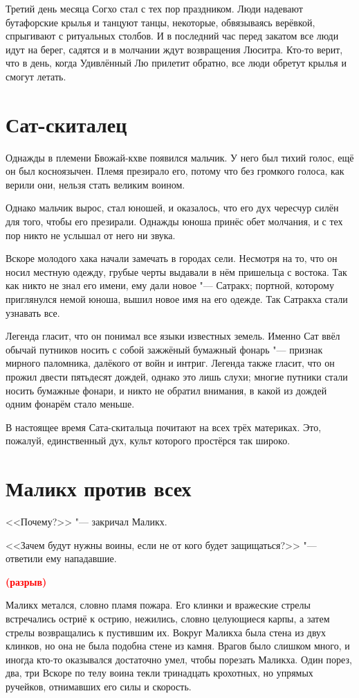 \documentclass[a4paper,10pt,fleqn]{book}
\newcommand{\ldotst}{\so{...}\xspace}
\newcommand{\spacing}{\textcolor{red}{\textbf{(разрыв)}}}
\begin{document}
Третий день месяца Согхо стал с тех пор праздником.
Люди надевают бутафорские крылья и танцуют танцы, некоторые, обвязываясь верёвкой, спрыгивают с ритуальных столбов.
И в последний час перед закатом все люди идут на берег, садятся и в молчании ждут возвращения Люситра.
Кто-то верит, что в день, когда Удивлённый Лю прилетит обратно, все люди обретут крылья и смогут летать.

\section{Сат-скиталец}

Однажды в племени Бвожай-кхве появился мальчик.
У него был тихий голос, ещё он был косноязычен.
Племя презирало его, потому что без громкого голоса, как верили они, нельзя стать великим воином.

Однако мальчик вырос, стал юношей, и оказалось, что его дух чересчур силён для того, чтобы его презирали.
Однажды юноша принёс обет молчания, и с тех пор никто не услышал от него ни звука.

Вскоре молодого хака начали замечать в городах сели.
Несмотря на то, что он носил местную одежду, грубые черты выдавали в нём пришельца с востока.
Так как никто не знал его имени, ему дали новое "--- Сатракх;
портной, которому приглянулся немой юноша, вышил новое имя на его одежде.
Так Сатракха стали узнавать все.

Легенда гласит, что он понимал все языки известных земель.
Именно Сат ввёл обычай путников носить с собой зажжёный бумажный фонарь "--- признак мирного паломника, далёкого от войн и интриг.
Легенда также гласит, что он прожил двести пятьдесят дождей, однако это лишь слухи;
многие путники стали носить бумажные фонари, и никто не обратил внимания, в какой из дождей одним фонарём стало меньше.

В настоящее время Сата-скитальца почитают на всех трёх материках.
Это, пожалуй, единственный дух, культ которого простёрся так широко.

\section{Маликх против всех}

<<Почему?>> "--- закричал Маликх.

<<Зачем будут нужны воины, если не от кого будет защищаться?>> "--- ответили ему нападавшие.

\spacing

Маликх метался, словно пламя пожара.
Его клинки и вражеские стрелы встречались остриё к острию, нежились, словно целующиеся карпы, а затем стрелы возвращались к пустившим их.
Вокруг Маликха была стена из двух клинков, но она не была подобна стене из камня.
Врагов было слишком много, и иногда кто-то оказывался достаточно умел, чтобы порезать Маликха.
Один порез, два, три\ldotst
Вскоре по телу воина текли тринадцать крохотных, но упрямых ручейков, отнимавших его силы и скорость.
\end{document}
